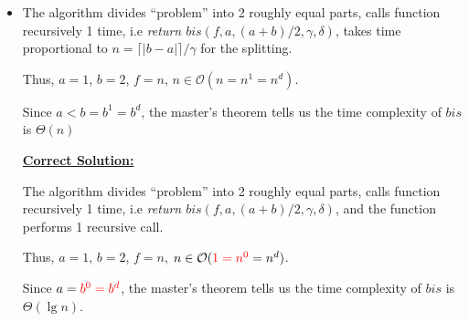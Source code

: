 \documentclass[12pt]{article}
\begin{document}
\begin{itemize}
    \item

    The algorithm divides ``problem'' into 2 roughly equal parts, calls function
    recursively 1 time, i.e \textit{return $bis(f,a,(a+b)/2,\gamma,\delta)$},
    takes time proportional to $n = \lceil \vert b -a \vert \rceil/\gamma$ for
    the splitting.

    \bigskip

    Thus, $a = 1$, $b = 2$, $f = n$, $n \in \mathcal{O}(n = n^1 = n^d)$.

    \bigskip

    Since $a < b = b^1 = b^d$, the master's theorem tells us the time complexity
    of $bis$ is $\Theta(n)$

    \bigskip

    \begin{mdframed}
        \underline{\textbf{Correct Solution:}}

        \bigskip

        The algorithm divides ``problem'' into 2 roughly equal parts, calls function
        recursively 1 time, i.e \textit{return $bis(f,a,(a+b)/2,\gamma,\delta)$},
        \color{red}and the function performs 1 recursive call\color{black}.

        \bigskip

        Thus, $a = 1$, $b = 2$, $f = n$, $n \in \mathcal{O}(\color{red}1 = n^0\color{black} = n^d)$.

        \bigskip

        Since $a = \color{red}b^0 = b^d\color{black}$, the master's theorem tells
        us the time complexity of $bis$ is \color{red}$\Theta(\lg n)$\color{black}.
    \end{mdframed}
\end{itemize}
\end{document}

